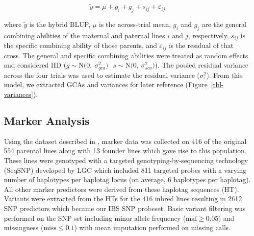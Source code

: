 \[\tilde{y} = \mu + g_i + g_j + s_{ij} + \varepsilon_{ij}\]

where \(\tilde{y}\) is the hybrid BLUP, \(\mu\) is the across-trial
mean, \(g_i\) and \(g_j\) are the general combining abilities of the
maternal and paternal lines \(i\) and \(j\), respectively, \(s_{ij}\) is
the specific combining ability of those parents, and
\(\varepsilon_{ij}\) is the residual of that cross. The general and
specific combining abilities were treated as random effects and
considered IID
(\(g \sim \mathrm{N(0,~}\sigma^2_{gca})~~~s \sim \mathrm{N(0,~}\sigma^2_{sca})\)).
The pooled residual variance across the four trials was used to estimate the residual variance (\(\sigma^2_{\varepsilon}\)). From this model, we
extracted GCAs and variances for later reference
(Figure~\ref{tbl-variances}).



\hypertarget{marker-analysis}{%
\subsection{Marker Analysis}\label{marker-analysis}}

Using the dataset described in \autocite{Adams2023}, marker data was
collected on 416 of the original 554 parental lines along with 13
founder lines which gave rise to this population. These lines were
genotyped with a targeted genotyping-by-sequencing technology (SeqSNP)
developed by LGC \autocite{LGC2019} which included 811 targeted probes
with a varying number of haplotypes per haplotag locus (on average, 6 haplotypes per
haplotag). All other marker predictors were derived from these haplotag sequences (HT). Variants were extracted from the HTs for the 416 inbred
lines resulting in 2612 SNP predictors which became our IBS SNP probeset. Basic variant filtering was performed
on the SNP set including minor allele frequency
(\(\text{maf} \ge 0.05\)) and missingness (\(\text{miss} \le 0.1\)) with
mean imputation performed on missing calls.

